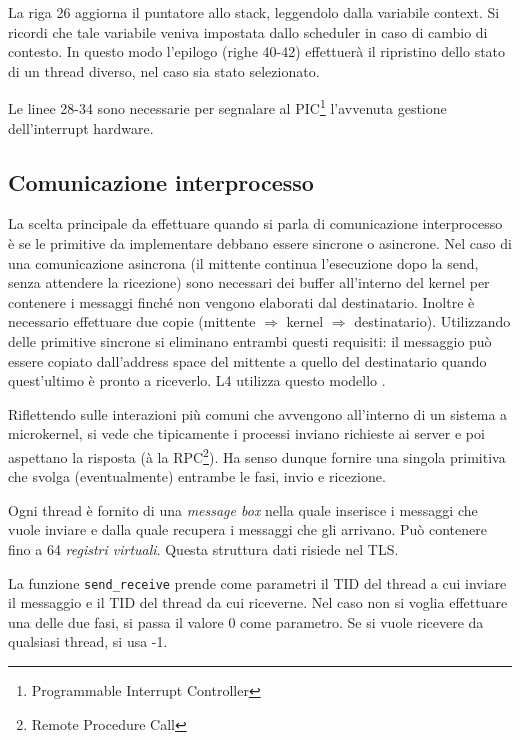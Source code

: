 \documentclass[12pt,a4paper]{report}
\begin{document}
			La riga 26 aggiorna il puntatore allo stack, leggendolo dalla variabile context. Si ricordi che tale variabile veniva
			impostata dallo scheduler in caso di cambio di contesto. In questo modo l'epilogo (righe 40-42) effettuerà il
			ripristino dello stato di un thread diverso, nel caso sia stato selezionato.
			
			Le linee 28-34 sono necessarie per segnalare al PIC\footnote{Programmable Interrupt Controller} l'avvenuta
			gestione dell'interrupt hardware.
			
		\subsection{Comunicazione interprocesso}
			La scelta principale da effettuare quando si parla di comunicazione interprocesso è se le primitive
			da implementare debbano essere sincrone o asincrone.
			Nel caso di una comunicazione asincrona (il mittente continua l'esecuzione dopo la send, senza attendere
			la ricezione) sono necessari dei buffer all'interno del kernel per contenere i messaggi finché non vengono elaborati dal destinatario.
			Inoltre è necessario effettuare due copie (mittente $\Rightarrow$ kernel $\Rightarrow$ destinatario).
			Utilizzando delle primitive sincrone si eliminano entrambi questi requisiti: il messaggio può essere copiato
			dall'address space del mittente a quello del destinatario quando quest'ultimo è pronto a riceverlo.
			L4 utilizza questo modello \cite{Neider}.
			
			Riflettendo sulle interazioni più comuni che avvengono all'interno di un sistema a microkernel, si vede
			che tipicamente i processi inviano richieste ai server e poi aspettano la risposta (à la RPC\footnote{Remote Procedure Call}).
			Ha senso dunque fornire una singola primitiva che svolga (eventualmente) entrambe le fasi, invio e ricezione.
					
			
			
			Ogni thread è fornito di una \emph{message box} nella quale inserisce i messaggi che vuole
			inviare e dalla quale recupera i messaggi che gli arrivano. Può contenere fino a 64 \emph{registri
			virtuali}. Questa struttura dati risiede nel TLS.
					
			
			
			La funzione \texttt{send\_receive} prende come parametri il TID del thread a cui inviare il messaggio
			e il TID del thread da cui riceverne. Nel caso non si voglia effettuare una delle due fasi, si
			passa il valore 0 come parametro. Se si vuole ricevere da qualsiasi thread, si usa -1.
			
\end{document}
